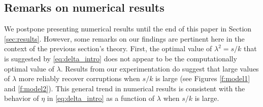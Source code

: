 %

\subsection{Remarks on numerical results}
We postpone presenting numerical results until the end of this paper in Section \ref{sec:results}. However, some remarks on our findings are pertinent here in the context of the previous section's theory. First, the optimal value of $\lambda^2 = s/k$ that is suggested by \eqref{eq:delta_intro} does not appear to be the computationally optimal value of $\lambda$.  Results from our experimentation do suggest that large values of $\lambda$ more reliably recover corruptions when $s/k$ is large (see Figures \ref{f:model1} and \ref{f:model2}). This general trend in numerical results is consistent with the behavior of $\eta$ in \eqref{eq:delta_intro} as a function of $\lambda$ when $s/k$ is large.

